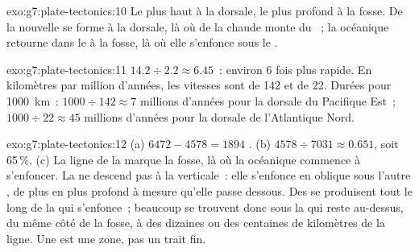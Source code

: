 \begin{solution}{exo:g7:plate-tectonics:10}
Le plus haut à la dorsale, le plus profond à la fosse. De la 
nouvelle se forme à la dorsale, là où de la  chaude monte du
~; la  océanique retourne dans le  à la fosse, là où
elle s'enfonce sous le .
\end{solution}

\begin{solution}{exo:g7:plate-tectonics:11}
$14.2 \div 2.2 \approx 6.45$~: environ 6 fois plus rapide.
En kilomètres par million d'années, les vitesses sont de 142 et de 22.
Durées pour \qty{1000}{km}~: $1000 \div 142 \approx 7$ millions d'années
pour la dorsale du Pacifique Est~; $1000 \div 22 \approx 45$ millions
d'années pour la dorsale de l'Atlantique Nord.
\end{solution}

\begin{solution}{exo:g7:plate-tectonics:12}
(a) $6472 - 4578 = 1894$ . (b) $4578 \div 7031 \approx 0.651$, soit
65\,\%. (c) La ligne de la  marque la fosse, là où la 
océanique commence à s'enfoncer. La  ne descend pas à la
verticale~: elle s'enfonce en oblique sous l'autre , de plus en plus
profond à mesure qu'elle passe dessous. Des  se produisent tout le
long de la  qui s'enfonce~; beaucoup se trouvent donc sous la 
qui reste au-dessus, du même côté de la fosse, à des dizaines ou des
centaines de kilomètres de la ligne. Une  est une zone,
pas un trait fin.
\end{solution}

